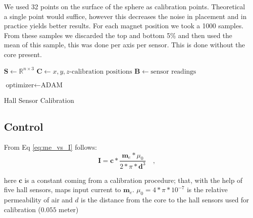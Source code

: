 We used 32 points on the surface of the sphere as calibration points. Theoretical a single point would suffice, however this decreases the noise in placement and in practice yields better results. For each magnet position we took a 1000 samples. From these samples we discarded the top and bottom 5\% and then used the mean of this sample, this was done per axis per sensor. This is done without the core present. 

\begin{algorithm}
\SetAlgoLined
{}

 $\mathbf{S}\leftarrow \mathbb{R}^{n \times 3}$
 $\mathbf{C}\leftarrow x,y,z\text{-calibration positions} $\;
 $\mathbf{B}\leftarrow \text{sensor readings}$\;
 
 $\text{optimizer} \leftarrow \text{ADAM}$\;
 \caption{Hall Sensor Calibration}
 \label{algo:hall_Calibration}
\end{algorithm}

\subsection{Control}

From Eq \ref{eq:me_vs_I} follows:
\begin{equation}\label{eq:I_vs_me}
    \mathbf{I} = \mathbf{c} * \frac{\mathbf{m}_e * \mu_0}{2*\pi*\mathbf{d}^3} \quad ,
\end{equation}

\noindent here $\mathbf{c}$ is a constant coming from a calibration procedure; that, with the help of five hall sensors, maps input current to $\mathbf{m}_e$. $\mu_0=4*\pi*10^{-7}$ is the relative permeability of air and $d$ is the distance from the core to the hall sensors used for calibration ($0.055$ meter)


